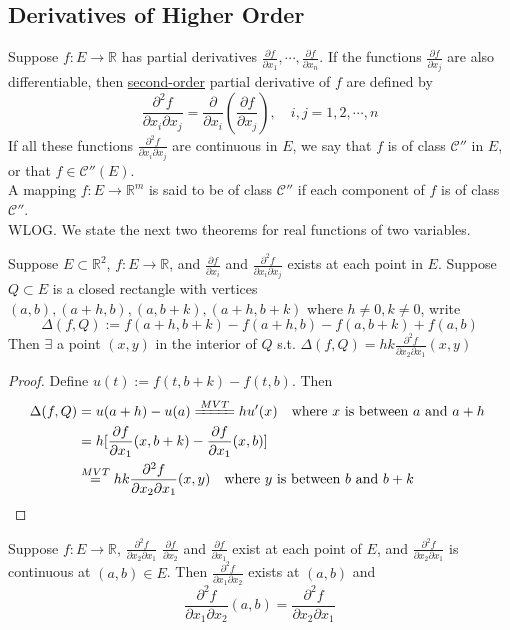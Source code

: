 \subsection{Derivatives of Higher Order}
Suppose  $ f:E\rightarrow \mathbb{R} $ has partial derivatives  $ \frac{\partial f}{\partial x_1},\cdots,\frac{\partial f}{\partial x_n} $. If the functions  $ \frac{\partial f}{\partial x_j} $ are also differentiable, then \underline{second-order} partial derivative of  $ f  $ are defined by
\[\frac{\partial^2 f}{\partial x_i\partial x_j}=\frac{\partial }{\partial x_i}(\frac{\partial f}{\partial x_j}),\quad i,j=1,2,\cdots,n\]
If all these functions   $  \frac{\partial^2 f}{\partial x_i\partial x_j} $ are continuous in  $ E  $, we say that  $ f  $ is of class  $ \mathscr{C}'' $ in  $ E  $, or that  $ f\in \mathscr{C}''(E) $.\\
A mapping  $ f:E \rightarrow \mathbb{R}^m  $ is said to be of class  $ \mathscr{C}'' $ if each component of  $ f  $ is of class  $ \mathscr{C}'' $.\\
WLOG. We state the next two theorems for real functions of two variables.
\begin{theorem}
    Suppose   $ E\subset \mathbb{R}^2 $, $ f:E\rightarrow \mathbb{R} $, and  $ \frac{\partial f}{\partial x_i} $ and  $ \frac{\partial^2 f}{\partial x_i\partial x_j} $ exists at each point in  $ E  $. Suppose  $ Q\subset E   $  is a closed rectangle with vertices $ (a,b),(a+h,b),(a,b+k),(a+h,b+k) $ where  $ h\not=0,k\not=0 $, write\[\Delta(f,Q):=f(a+h,b+k)-f(a+h,b)-f(a,b+k)+f(a,b)\] 
    Then  $ \exists  $ a point  $ (x,y) $ in the interior of  $ Q  $ s.t.  $ \Delta (f,Q )=hk\frac{\partial^2 f}{\partial x_2\partial x_1}(x,y) $  
\end{theorem}
\begin{proof}
    Define  $ u(t):=f(t,b+k)-f(t,b) $. Then 
    \begin{align*}
        \Delta(f,Q )&=u(a+h)-u(a)\xlongequal{MVT}hu'(x)\quad \text{where  $ x  $ is between  $ a  $ and  $ a+h $ }\\
        &=h[\frac{\partial f}{\partial x_1}(x,b+k)-\frac{\partial f}{\partial x_1}(x,b)]\\
        &\overset{MVT}{=}hk\frac{\partial^2 f}{\partial x_2\partial x_1}(x,y)\quad \text{where  $ y $ is between  $ b  $ and  $ b+k $ }
    \end{align*}
\end{proof}
\begin{theorem}
    Suppose  $ f:E\rightarrow \mathbb{R} $, $ \frac{\partial^2 f}{\partial x_2\partial x_1} $  $ \frac{\partial f}{\partial x_2} $ and  $ \frac{\partial f}{\partial x_1} $  exist at each point of  $ E  $, and  $  \frac{\partial^2 f}{\partial x_2\partial x_1}  $ is continuous at  $ (a,b)\in E $. Then  $  \frac{\partial^2 f}{\partial x_1\partial x_2}  $ exists at  $ (a,b) $ and 
    \[ \dfrac{\partial^2 f}{\partial x_1\partial x_2} (a,b)= \dfrac{\partial^2 f}{\partial x_2\partial x_1} \]   
\end{theorem}
